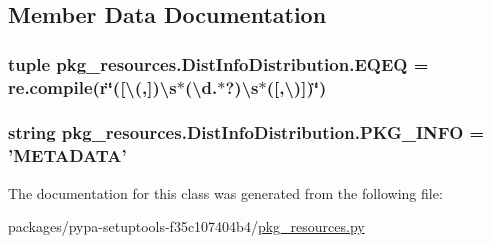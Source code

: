 \subsection{Member Data Documentation}
\hypertarget{classpkg__resources_1_1DistInfoDistribution_a0f8bf82f8f8b3a3a05daac595841d8a0}{}
\subsubsection[{E\+Q\+E\+Q}]{\setlength{\rightskip}{0pt plus 5cm}tuple pkg\+\_\+resources.\+Dist\+Info\+Distribution.\+E\+Q\+E\+Q = re.\+compile({\bf r}\char`\"{}(\mbox{[}\textbackslash{}(,\mbox{]})\textbackslash{}s$\ast$(\textbackslash{}d.$\ast$?)\textbackslash{}{\bf s}$\ast$(\mbox{[},\textbackslash{})\mbox{]})\char`\"{})\hspace{0.3cm}{\ttfamily [static]}}\label{classpkg__resources_1_1DistInfoDistribution_a0f8bf82f8f8b3a3a05daac595841d8a0}
\hypertarget{classpkg__resources_1_1DistInfoDistribution_ab6da982f7c44c3f4e90ea400128f653d}{}
\subsubsection[{P\+K\+G\+\_\+\+I\+N\+F\+O}]{\setlength{\rightskip}{0pt plus 5cm}string pkg\+\_\+resources.\+Dist\+Info\+Distribution.\+P\+K\+G\+\_\+\+I\+N\+F\+O = 'M\+E\+T\+A\+D\+A\+T\+A'\hspace{0.3cm}{\ttfamily [static]}}\label{classpkg__resources_1_1DistInfoDistribution_ab6da982f7c44c3f4e90ea400128f653d}


The documentation for this class was generated from the following file\+:\begin{DoxyCompactItemize}
\item 
packages/pypa-\/setuptools-\/f35c107404b4/\hyperlink{pkg__resources_8py}{pkg\+\_\+resources.\+py}\end{DoxyCompactItemize}
